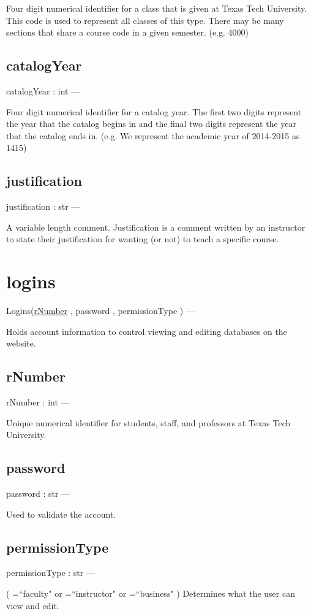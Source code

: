 \documentclass[10pt]{article}
\begin{document}
	Four digit numerical identifier for a class that is given at Texas Tech University. This code is used to represent all classes of this type. There may be many sections that share a course code in a given semester. (e.g. 4000)
	
	\subsection{catalogYear}
	catalogYear : int ---
	
	Four digit numerical identifier for a catalog year. The first two digits represent the year that the catalog begins in and the final two digits represent the year that the catalog ends in. (e.g. We represent the academic year of 2014-2015 as 1415)
	
	\subsection{justification}
	justification : str ---
	
	A variable length comment. Justification is a comment written by an instructor to state their justification for wanting (or not) to teach a specific course. 


\section{logins}
Logins(\underline{rNumber} , password , permissionType ) ---

Holds account information to control viewing and editing databases on the website.
	
	\subsection{rNumber}
	rNumber : int ---
	
	Unique numerical identifier for students, staff, and professors at Texas Tech University.
    
    \subsection{password}
    password : str ---
    
    Used to validate the account.
    
    \subsection{permissionType}
    permissionType : str --- 
    
    ( =``faculty" or =``instructor" or =``business" ) Determines what the user can view and edit.
\end{document}
